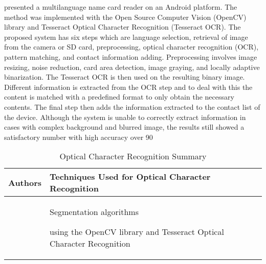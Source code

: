  presented a multilanguage name card reader on an Android platform. The method was implemented with the Open Source Computer Vision (OpenCV) library and Tesseract Optical Character Recognition (Tesseract OCR). The proposed system has six steps which are language selection, retrieval of image from the camera or SD card, preprocessing, optical character recognition (OCR), pattern matching, and contact information adding. Preprocessing involves image resizing, noise reduction, card area detection, image graying, and locally adaptive binarization. The Tesseract OCR is then used on the resulting binary image. Different information is extracted from the OCR step and to deal with this the content is matched with a predefined format to only obtain the necessary contents. The final step then adds the information extracted to the contact list of the device. Although the system is unable to correctly extract information in cases with complex background and blurred image, the results still showed a satisfactory number with high accuracy over 90%


\begin{table}[h]
	\begin{center}
		\begin{tabular}{| l | l |} 
			\hline
			Authors &
			Techniques Used for Optical Character Recognition \\ [0.5ex] 
			\hline\hline
			\shortciteA{vuong14} &  \parbox[t]{3in}{Segmentation algorithms \par using the OpenCV
				library and Tesseract Optical Character Recognition} \\ [0.5ex]
			\hline
		\end{tabular}
		\caption{Optical Character Recognition Summary}
		\label{table}
	\end{center}
\end{table}







\begin{comment}
%
%
Guide on Writing your RRL chapter

1. Identify the keywords with respect to your research
One keyword = One document section
Examples: 2.1 Story Generation Systems
2.2 Knowledge Representation

2.  Find references using these keywords

3.  For each of the references that you find,
Check: Is it relevant to your research?
Use their references to find more relevant works.

4. Identify a set of criteria for comparison.
It will serve as a guide to help you focus on what to look for

5. Write a summary focusing on -
What: A short description of the work
How: A summary of the approach it utilized
Findings: If applicable, provide the results
Why: Relevance to your work

6. At the end of each section,  show a Table of Comparison of the related works 
and your proposed project/system

\end{comment}

